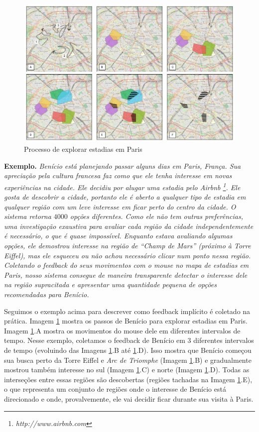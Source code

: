 \begin{figure}[t]
	\centering
	\includegraphics[width=\textwidth]{imagens/caso-de-estudo}
	\caption{Processo de explorar estadias em Paris}
	\label{fig:regions}
\end{figure}

{\bf Exemplo.} {\em Benício está planejando passar alguns dias em Paris, França. Sua apreciação pela cultura francesa faz como que ele tenha interesse em novas experiências na cidade. Ele decidiu por alugar uma estadia pelo Airbnb \footnote{\it http://www.airbnb.com}. Ele gosta de descobrir a cidade, portanto ele é aberto a qualquer tipo de estadia em qualquer região com um leve interesse em ficar perto do centro da cidade. O sistema retorna $4000$ opções diferentes. Como ele não tem outras preferências, uma investigação exaustiva para avaliar cada região da cidade independentemente é necessário, o que é quase impossível. Enquanto estava avaliando algumas opções, ele demostrou interesse na região de  ``Champ de Mars'' (próximo à Torre Eiffel), mas ele esqueceu ou não achou necessário clicar num ponto nessa região. Coletando o feedback do seus movimentos com o mouse no mapa de estadias em Paris, nosso sistema consegue de maneira transparente detectar o interesse dele na região supracitada e apresentar uma quantidade pequena de opções recomendadas para Benício.}

Seguimos o exemplo acima para descrever como feedback implícito é coletado na prática. Imagem \ref{fig:regions} mostra os passos de Benício para explorar estadias em Paris. Imagem \ref{fig:regions}.A mostra os movimentos do mouse dele em diferentes intervalos de tempo. Nesse exemplo, coletamos o feedback de Benício em 3 diferentes intervalos de tempo (evoluindo das Imagens \ref{fig:regions}.B até \ref{fig:regions}.D). Isso mostra que Benício começou sua busca perto da Torre Eiffel e {\em Arc de Triomphe} (Imagem \ref{fig:regions}.B) e gradualmente mostrou também interesse no sul (Imagem \ref{fig:regions}.C) e norte (Imagem \ref{fig:regions}.D). Todas as interseções entre essas regiões são descobertas (regiões tachadas na Imagem \ref{fig:regions}.E), o que representa um conjunto de regiões onde o interesse de Benício está direcionado e onde, provalvemente, ele vai decidir ficar durante sua visita à Paris.

